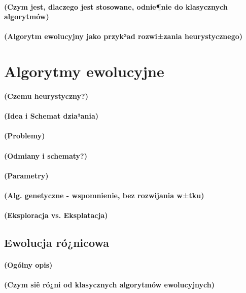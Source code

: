 \documentclass[11pt]{report}
\begin{document}
\paragraph{
(Czym jest, dlaczego jest stosowane, odnie¶nie do klasycznych algorytmów)
}
\paragraph{
(Algorytm ewolucyjny jako przyk³ad rozwi±zania heurystycznego)
}
\section{Algorytmy ewolucyjne}
\paragraph{
(Czemu heurystyczny?)
}
\paragraph{
(Idea i Schemat dzia³ania)
}
\paragraph{
(Problemy)
}
\paragraph{
(Odmiany i schematy?)
}
\paragraph{
(Parametry)
}
\paragraph{
(Alg. genetyczne - wspomnienie, bez rozwijania w±tku)
}
\paragraph{
(Eksploracja vs. Eksplatacja)
}
\subsection{Ewolucja ró¿nicowa}
\paragraph{
(Ogólny opis)
}
\paragraph{
(Czym siê ró¿ni od klasycznych algorytmów ewolucyjnych)
}
\end{document}
